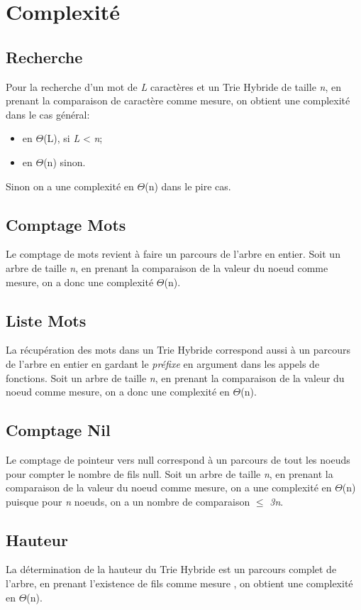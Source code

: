\documentclass[a4paper,12pt]{report}
\begin{document}
\section{Complexité}
\subsection{Recherche}
Pour la recherche d'un mot de \textit{L} caractères et un Trie Hybride de taille \textit{n}, 
en prenant la comparaison de caractère comme mesure, on obtient une complexité dans le cas général:
\begin{itemize}
 \item en $\Theta$(L), si \textit{L} < \textit{n};
 \item en $\Theta$(n) sinon.
\end{itemize}
Sinon on a une complexité en $\Theta$(n) dans le pire cas.

\subsection{Comptage Mots}
Le comptage de mots revient à faire un parcours de l'arbre en entier.
Soit un arbre de taille \textit{n}, en prenant la comparaison de la valeur du noeud comme mesure,
on a donc une complexité $\Theta$(n).

\subsection{Liste Mots}
La récupération des mots dans un Trie Hybride correspond aussi à un parcours de l'arbre en entier en gardant le \textit{préfixe}
en argument dans les appels de fonctions.
Soit un arbre de taille \textit{n}, en prenant la comparaison de la valeur du noeud comme mesure,
on a donc une complexité en $\Theta$(n).

\subsection{Comptage Nil}
Le comptage de pointeur vers null correspond à un parcours de tout les noeuds pour compter le nombre de fils null.
Soit un arbre de taille \textit{n}, en prenant la comparaison de la valeur du noeud comme mesure,
on a une complexité en $\Theta$(n) puisque pour \textit{n} noeuds, on a un nombre de comparaison $\le$ \textit{3n}.

\subsection{Hauteur}
La détermination de la hauteur du Trie Hybride est un parcours complet de l'arbre, en prenant l'existence de fils comme mesure
, on obtient une complexité en $\Theta$(n).
\end{document}
